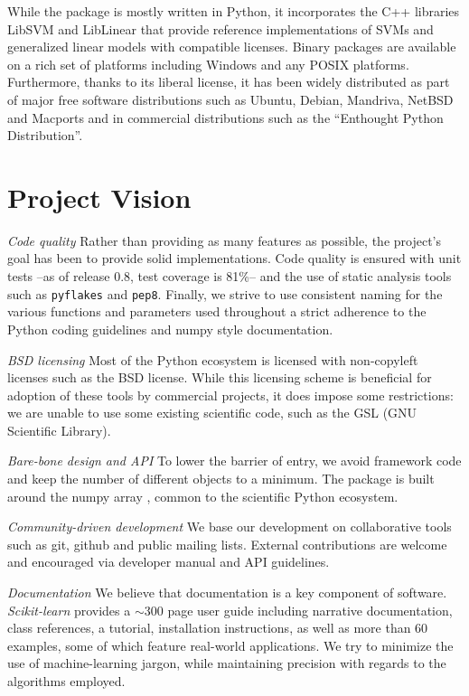\documentclass[twoside,11pt]{article}
\begin{document}
While the package is mostly written in Python, it incorporates the C++
libraries LibSVM \citep{chang2001} and LibLinear \citep{fan2008} that
provide reference implementations of SVMs and generalized linear models
with compatible licenses.
%
Binary packages are available on a rich set of platforms including
Windows and any POSIX platforms. Furthermore, thanks to its liberal
license, it has been widely distributed as part
of major free software distributions such as Ubuntu, Debian, Mandriva,
NetBSD and Macports and in commercial distributions such as the ``Enthought
Python Distribution''.


\section{Project Vision}

\emph{Code quality}
%
Rather than providing as many features as possible, the project's goal has been to provide solid
implementations. Code quality is ensured with unit
tests --as of release 0.8, test coverage is 81\%-- and the use of static
analysis tools such as {\tt pyflakes} and {\tt pep8}. Finally, we
strive to use consistent naming for the various functions and
parameters used throughout a strict adherence to the Python coding
guidelines and numpy style documentation.

\emph{BSD licensing}
%
Most of the Python ecosystem is licensed with non-copyleft licenses such
as the BSD license. While this licensing scheme is beneficial for adoption
of these tools by commercial
projects, it does impose some restrictions: we are unable to use some existing
scientific code, such as the GSL (GNU Scientific Library).

\emph{Bare-bone design and API}
%
To lower the barrier of entry, we avoid framework code and keep the number
of different objects to a minimum.
The package is built
around the numpy array \citep{Vanderwalt2011}, common to the
scientific Python ecosystem.

\emph{Community-driven development}
%
We base our development on collaborative tools such as git, github and
public mailing lists. External contributions are welcome and
encouraged via developer manual and API guidelines.

\emph{Documentation}
%
We believe that documentation is a key component of software.
\emph{Scikit-learn} provides a $\sim$300 page user guide including
narrative documentation, class references, a tutorial, installation
instructions, as well as more than 60 examples, some of which feature
real-world applications. We try to minimize the use of
machine-learning jargon, while maintaining precision with
regards to the algorithms employed.
\end{document}
